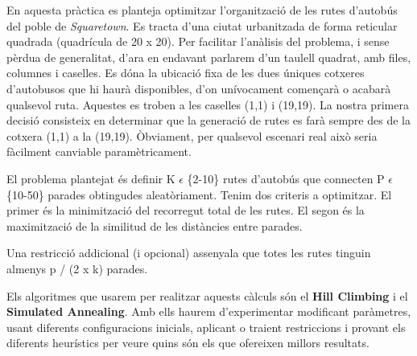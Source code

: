 En aquesta pràctica es planteja optimitzar l'organització de les rutes d'autobús del poble de \emph{Squaretown}. Es tracta d'una ciutat urbanitzada de forma reticular quadrada (quadrícula de 20 x 20). Per facilitar l'anàlisis del problema, i sense pèrdua de generalitat, d'ara en endavant parlarem d'un taulell quadrat, amb files, columnes i caselles. Es dóna la ubicació fixa de les dues úniques cotxeres d'autobusos que hi haurà disponibles, d'on unívocament començarà o acabarà qualsevol ruta. Aquestes es troben a les caselles (1,1) i (19,19). La nostra primera decisió consisteix en determinar que la generació de rutes es farà sempre des de la cotxera (1,1) a la (19,19). Òbviament, per qualsevol escenari real això seria fàcilment canviable paramètricament.

El problema plantejat és definir K $\epsilon$ \{2-10\} rutes d'autobús que connecten P $\epsilon$ \{10-50\} parades obtingudes aleatòriament. Tenim dos criteris a optimitzar. El primer és la minimització del recorregut total de les rutes. El segon és la maximització de la similitud de les distàncies entre parades.

Una restricció addicional (i opcional) assenyala que totes les rutes tinguin almenys p / (2 x k) parades.

Els algoritmes que usarem per realitzar aquests càlculs són el \textbf{Hill Climbing} i el \textbf{Simulated Annealing}. Amb ells haurem d'experimentar modificant paràmetres, usant diferents configuracions inicials, aplicant o traient restriccions i provant els diferents heurístics per veure quins són els que ofereixen millors resultats.


% 
% 
% 
% 
% 
% 
% 

% 
% 
